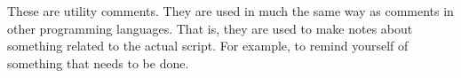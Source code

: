 \documentclass{book}
\begin{document}
\begin{SSCodeBox}
 \\
\scitea{} \\
\scitea{} \\
\scitek{/* } \\
 \\
 \\
\scitek{*/}
\scitea{} \\
\scitea{} \\
 \\
\scitea{} \\
\scitea{} \\
 \\
 \\
 \\
\scitea{} \\
\scitea{} \\
 \\
\scitea{} \\
\scitea{} \\
 \\
 \\
 \\
\end{SSCodeBox}

 These are utility comments.  They are used in much the same way as comments in other programming languages.  That is, they are used to make notes about something related to the actual script.  For example, to remind yourself of something that needs to be done.

\begin{SSCodeBox}
\scitea{\{} \\
\scitea{\hspace*{4em}}
\scitea{;} \\
\scitea{\hspace*{4em}} \\
\scitea{\hspace*{4em}}
 \\
\scitea{=}
\scitea{;} \\
\scitea{\}} \\
\end{SSCodeBox}
\end{document}

